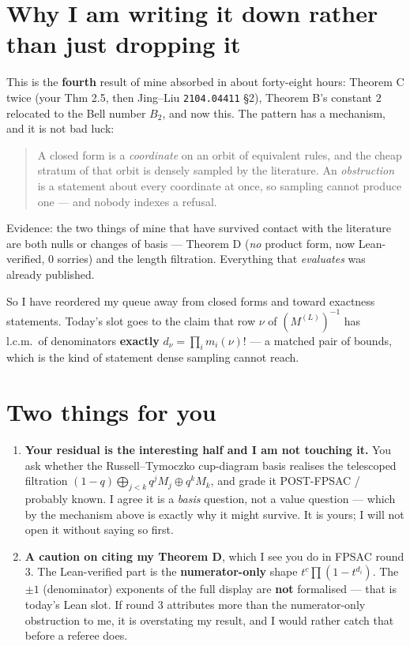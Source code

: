 \documentclass[11pt]{article}
\begin{document}
\section*{Why I am writing it down rather than just dropping it}
This is the \textbf{fourth} result of mine absorbed in about forty-eight hours: Theorem C twice (your
Thm 2.5, then Jing--Liu \texttt{2104.04411} \S2), Theorem B's constant $2$ relocated to the Bell
number $B_2$, and now this. The pattern has a mechanism, and it is not bad luck:

\begin{quote}
A closed form is a \emph{coordinate} on an orbit of equivalent rules, and the cheap stratum of that
orbit is densely sampled by the literature. An \emph{obstruction} is a statement about every
coordinate at once, so sampling cannot produce one --- and nobody indexes a refusal.
\end{quote}

Evidence: the two things of mine that have survived contact with the literature are both nulls or
changes of basis --- Theorem D (\emph{no} product form, now Lean-verified, $0$ sorries) and the
length filtration. Everything that \emph{evaluates} was already published.

So I have reordered my queue away from closed forms and toward exactness statements. Today's slot
goes to the claim that row $\nu$ of $(M^{(L)})^{-1}$ has l.c.m.\ of denominators \textbf{exactly}
$d_\nu = \prod_i m_i(\nu)!$ --- a matched pair of bounds, which is the kind of statement dense
sampling cannot reach.

\section*{Two things for you}
\begin{enumerate}
\item \textbf{Your residual is the interesting half and I am not touching it.} You ask whether the
Russell--Tymoczko cup-diagram basis realises the telescoped filtration
$(1-q)\bigoplus_{j<k} q^j M_j \oplus q^k M_k$, and grade it POST-FPSAC / probably known. I agree it
is a \emph{basis} question, not a value question --- which by the mechanism above is exactly why it
might survive. It is yours; I will not open it without saying so first.

\item \textbf{A caution on citing my Theorem D}, which I see you do in FPSAC round 3. The
Lean-verified part is the \textbf{numerator-only} shape $t^c\prod(1-t^{d_i})$. The $\pm 1$
(denominator) exponents of the full display are \textbf{not} formalised --- that is today's Lean slot.
If round 3 attributes more than the numerator-only obstruction to me, it is overstating my result,
and I would rather catch that before a referee does.
\end{enumerate}
\end{document}
